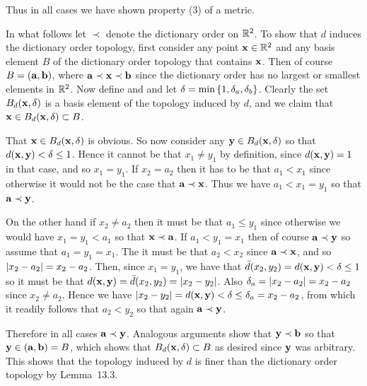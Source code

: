 {{    Thus in all cases we have shown property (3) of a metric.

    In what follows let $\prec$ denote the dictionary order on ${\mathbb{R}}^2$.
    To show that $d$ induces the dictionary order topology, first consider any point $\mathbf{x} \in {\mathbb{R}}^2$ and any basis element $B$ of the dictionary order topology that contains $\mathbf{x}$.
    Then of course $B = (\mathbf{a}, \mathbf{b})$, where $\mathbf{a} \prec \mathbf{x} \prec \mathbf{b}$ since the dictionary order has no largest or smallest elements in ${\mathbb{R}}^2$.
    Now define
    and
    and let $\delta = \min\left\{ 1, \delta_a, \delta_b \right\}$.
    Clearly the set $B_d(\mathbf{x}, \delta)$ is a basis element of the topology induced by $d$, and we claim that $\mathbf{x} \in B_d(\mathbf{x}, \delta) \subset B$.

    That $\mathbf{x} \in B_d(\mathbf{x}, \delta)$ is obvious.
    So now consider any $\mathbf{y} \in B_d(\mathbf{x}, \delta)$ so that $d(\mathbf{x}, \mathbf{y}) < \delta \leq 1$.
    Hence it cannot be that $x_1 \neq y_1$ by definition, since $d(\mathbf{x}, \mathbf{y}) = 1$ in that case,  and so $x_1 = y_1$.
    If $x_2 = a_2$ then it has to be that $a_1 < x_1$ since otherwise it would not be the case that $\mathbf{a} \prec \mathbf{x}$.
    Thus we have $a_1 < x_1 = y_1$ so that $\mathbf{a} \prec \mathbf{y}$.

    On the other hand if $x_2 \neq a_2$ then it must be that $a_1 \leq y_1$ since otherwise we would have $x_1 = y_1 < a_1$ so that $\mathbf{x} \prec \mathbf{a}$.
    If $a_1 < y_1 = x_1$ then of course $\mathbf{a} \prec \mathbf{y}$ so assume that $a_1 = y_1 = x_1$.
    The it must be that $a_2 < x_2$ since $\mathbf{a} \prec \mathbf{x}$, and so $\left| x_2 - a_2 \right| = x_2 - a_2$.
    Then, since $x_1 = y_1$, we have that $\bar{d}(x_2, y_2) = d(\mathbf{x}, \mathbf{y}) < \delta \leq 1$ so it must be that $d(\mathbf{x}, \mathbf{y}) = \bar{d}(x_2, y_2) = \left| x_2 - y_2 \right|$.
    Also $\delta_a = \left| x_2 - a_2 \right| = x_2 - a_2$ since $x_2 \neq a_2$.
    Hence we have $\left| x_2 - y_2 \right| = d(\mathbf{x}, \mathbf{y}) < \delta \leq \delta_a = x_2 - a_2$, from which it readily follows that $a_2 < y_2$ so that again $\mathbf{a} \prec \mathbf{y}$.

    Therefore in all cases $\mathbf{a} \prec \mathbf{y}$.
    Analogous arguments show that $\mathbf{y} \prec \mathbf{b}$ so that $\mathbf{y} \in (\mathbf{a}, \mathbf{b}) = B$, which shows that $B_d(\mathbf{x}, \delta) \subset B$ as desired since $\mathbf{y}$ was arbitrary.
    This shows that the topology induced by $d$ is finer than the dictionary order topology by Lemma~13.3.

}}
